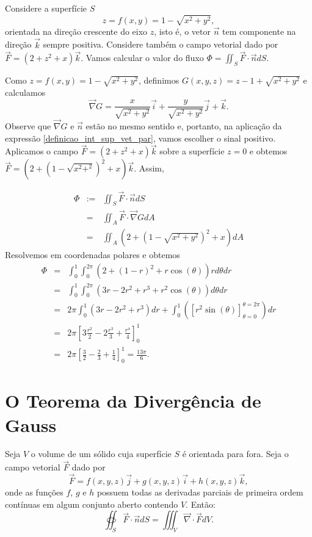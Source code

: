\begin{ex}\label{int_sup_ex_2} Considere a superfície $S$
 $$z=f(x,y)=1- \sqrt{x^2+y^2},$$
orientada na direção crescente do eixo $z$, isto é, o vetor $\vec{n}$ tem componente na direção $\vec{k}$ sempre positiva. Considere também o campo vetorial dado por
$\vec{F}=(2+z^2+x)\vec{k}$. Vamos calcular o valor do fluxo $\Phi=\iint_S\vec{F}\cdot \vec{n} dS$.

Como $z=f(x,y)=1- \sqrt{x^2+y^2}$, definimos $G(x,y,z) = z-1+ \sqrt{x^2+y^2}$ e calculamos
$$
\vec{\nabla} G=\frac{x}{\sqrt{x^2+y^2}}\vec{i}+\frac{y}{\sqrt{x^2+y^2}}\vec{j}+\vec{k}.
$$
Observe que $\vec{\nabla} G$ e $\vec{n}$ estão no mesmo sentido e, portanto, na aplicação da expressão \eqref{definicao_int_sup_vet_par}, vamos escolher o sinal positivo. Aplicamos o campo $\vec{F}=(2+z^2+x)\vec{k}$ sobre a superfície $z=0$ e obtemos $\vec{F}=(2+(1-\sqrt{x^2+^2})^2+x)\vec{k}$. Assim,


\begin{eqnarray*}
\Phi&:=&\iint_{S} \vec{F}\cdot \vec{n}dS\\
&=&\iint_A \vec{F}\cdot \vec{\nabla} G dA\\
&=&\iint_A \left(2+\left(1- \sqrt{x^2+y^2}\right)^2+x\right) dA
\end{eqnarray*}
Resolvemos em coordenadas polares e obtemos
\begin{eqnarray*}
\Phi&=&\int_0^1\int_0^{2\pi} \left(2+(1- r)^2+r\cos(\theta)\right) rd\theta dr\\
&=&\int_0^1\int_0^{2\pi} \left(3r- 2r^2 + r^3+r^2\cos(\theta)\right) d\theta dr\\
&=&2\pi\int_0^{1}\left(3r- 2r^2 + r^3\right) dr+\int_0^1\left(\left[r^2\sin(\theta)\right]_{\theta=0}^{\theta=2\pi} \right)dr \\
&=&2\pi\left[3\frac{r^2}{2}- 2\frac{r^3}{3} + \frac{r^4}{4}\right]_0^1\\
&=&2\pi\left[\frac{3}{2}- \frac{2}{3} + \frac{1}{4}\right]_0^1=\frac{13\pi}{6}.
\end{eqnarray*}

\end{ex}



\section{O Teorema da Divergência de Gauss}
\begin{teo}
Seja $V$ o volume de um sólido cuja superfície $S$ é orientada para fora. Seja o campo vetorial $\vec{F}$ dado por
$$
\vec{F}=f(x,y,z)\vec{j}+g(x,y,z)\vec{i}+h(x,y,z)\vec{k},
$$
onde as funções $f$, $g$ e $h$ possuem todas as derivadas parciais de primeira ordem contínuas em algum conjunto aberto contendo $V$. Então:
$$
\oiint_S \vec{F}\cdot \vec{n} dS=\iiint_V \vec{\nabla}\cdot \vec{F} dV.
$$
\end{teo}

